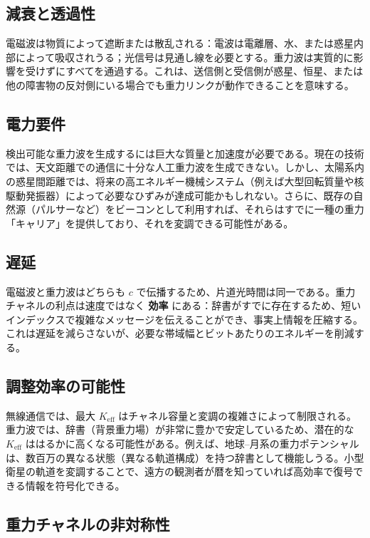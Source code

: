 \documentclass[12pt,a4paper]{article}
\newcommand{\Keff}{K_{\mathrm{eff}}}
\begin{document}
	\subsection{減衰と透過性}
	
	電磁波は物質によって遮断または散乱される：電波は電離層、水、または惑星内部によって吸収されうる；光信号は見通し線を必要とする。重力波は実質的に影響を受けずにすべてを通過する。これは、送信側と受信側が惑星、恒星、または他の障害物の反対側にいる場合でも重力リンクが動作できることを意味する。
	
	\subsection{電力要件}
	
	検出可能な重力波を生成するには巨大な質量と加速度が必要である。現在の技術では、天文距離での通信に十分な人工重力波を生成できない。しかし、太陽系内の惑星間距離では、将来の高エネルギー機械システム（例えば大型回転質量や核駆動発振器）によって必要なひずみが達成可能かもしれない。さらに、既存の自然源（パルサーなど）をビーコンとして利用すれば、それらはすでに一種の重力「キャリア」を提供しており、それを変調できる可能性がある。
	
	\subsection{遅延}
	
	電磁波と重力波はどちらも \(c\) で伝播するため、片道光時間は同一である。重力チャネルの利点は速度ではなく \textbf{効率} にある：辞書がすでに存在するため、短いインデックスで複雑なメッセージを伝えることができ、事実上情報を圧縮する。これは遅延を減らさないが、必要な帯域幅とビットあたりのエネルギーを削減する。
	
	\subsection{調整効率の可能性}
	
	無線通信では、最大 \(\Keff\) はチャネル容量と変調の複雑さによって制限される。重力波では、辞書（背景重力場）が非常に豊かで安定しているため、潜在的な \(\Keff\) ははるかに高くなる可能性がある。例えば、地球–月系の重力ポテンシャルは、数百万の異なる状態（異なる軌道構成）を持つ辞書として機能しうる。小型衛星の軌道を変調することで、遠方の観測者が暦を知っていれば高効率で復号できる情報を符号化できる。
	
	\subsection{重力チャネルの非対称性}
	\label{subsec:asymmetry}
	
\end{document}
